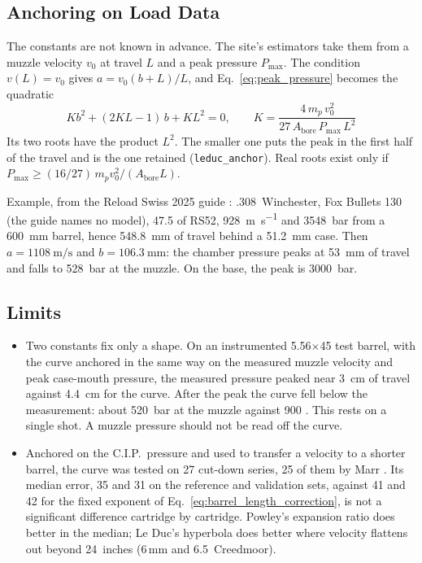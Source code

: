 \documentclass[11pt,twoside,openright]{report}
\begin{document}
\subsection{Anchoring on Load Data}

The constants are not known in advance. The site's estimators take them from a muzzle velocity $v_0$ at travel $L$ and a peak pressure $P_{\max}$. The condition $v(L) = v_0$ gives $a = v_0 (b + L)/L$, and Eq.~\eqref{eq:peak_pressure} becomes the quadratic
\begin{equation}
  K b^2 + (2KL - 1)\,b + K L^2 = 0, \qquad K = \frac{4\,m_p\,v_0^2}{27\,A_{\mathrm{bore}}\,P_{\max}\,L^2}
  \label{eq:leduc_anchor}
\end{equation}
Its two roots have the product $L^2$. The smaller one puts the peak in the first half of the travel and is the one retained (\texttt{leduc\_anchor}). Real roots exist only if $P_{\max} \ge (16/27)\,m_p v_0^2/(A_{\mathrm{bore}} L)$.

Example, from the Reload Swiss 2025 guide \citep{reloadswiss2025}: .308~Winchester, Fox Bullets \SI{130}{\grain} (the guide names no model), \SI{47.5}{\grain} of RS52, \SI{928}{\meter\per\second} and \SI{3548}{\bar} from a \SI{600}{\milli\meter} barrel, hence \SI{548.8}{\milli\meter} of travel behind a \SI{51.2}{\milli\meter} case. Then $a = \SI{1108}{\meter\per\second}$ and $b = \SI{106.3}{\milli\meter}$: the chamber pressure peaks at \SI{53}{\milli\meter} of travel and falls to \SI{528}{\bar} at the muzzle. On the base, the peak is \SI{3000}{\bar}.

\subsection{Limits}

\begin{itemize}
  \item Two constants fix only a shape. On an instrumented 5.56$\times$45 test barrel, with the curve anchored in the same way on the measured muzzle velocity and peak case-mouth pressure, the measured pressure peaked near \SI{3}{\centi\meter} of travel against \SI{4.4}{\centi\meter} for the curve. After the peak the curve fell below the measurement: about \SI{520}{\bar} at the muzzle against 900 \citep{yun2010experimental}. This rests on a single shot. A muzzle pressure should not be read off the curve.
  \item Anchored on the C.I.P.\ pressure and used to transfer a velocity to a shorter barrel, the curve was tested on 27 cut-down series, 25 of them by Marr \citep{marrBarrelSeries}. Its median error, 35 and \SI{31}{\fps} on the reference and validation sets, against 41 and \SI{42}{\fps} for the fixed exponent of Eq.~\eqref{eq:barrel_length_correction}, is not a significant difference cartridge by cartridge. Powley's expansion ratio does better in the median; Le Duc's hyperbola does better where velocity flattens out beyond 24~inches (6\,mm and 6.5~Creedmoor).
\end{itemize}
\end{document}
